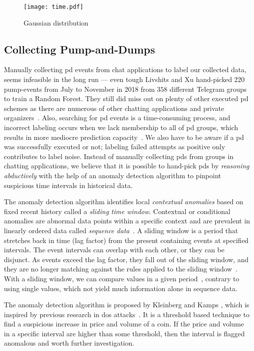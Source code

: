 \begin{figure}
    \centering
    \texttt{[image: time.pdf]}
    \caption{Gaussian distribution}
    \label{fig:unixtime}
\end{figure}

\subsection{Collecting Pump-and-Dumps}
Manually collecting \ac{pd} events from chat applications to label our collected data, seems infeasible in the long run — even tough Livshits and Xu \cite{P&D_anatomy} hand-picked $220$ pump-events from July to November in 2018 from $358$ different Telegram groups to train a Random Forest. They still did miss out on plenty of other executed \ac{pd} schemes as there are numerous of other chatting applications and private organizers~\cite{blockonomi}. Also, searching for \ac{pd} events is a time-consuming process, and incorrect labeling occurs when we lack membership to all of \ac{pd} groups, which results in more mediocre prediction capacity~\cite{label_noise}. We also have to be aware if a \ac{pd} was successfully executed or not; labeling failed attempts as positive only contributes to label noise. Instead of manually collecting \acp{pd} from groups in chatting applications, we believe that it is possible to hand-pick \acp{pd} by \emph{reasoning abductively} with the help of an anomaly detection algorithm to pinpoint suspicious time intervals in historical data.

The anomaly detection algorithm identifies local \emph{contextual anomalies} based on fixed recent history called a \emph{sliding time window}. Contextual or conditional anomalies are abnormal data points within a specific context and are prevalent in linearly ordered data called \emph{sequence data}~\cite{anomaly_survey}. A sliding window is a period that stretches back in time (lag factor) from the present containing events at specified intervals. The event intervals can overlap with each other, or they can be disjunct. As events exceed the lag factor, they fall out of the sliding window, and they are no longer matching against the rules applied to the sliding window~\cite{redhat}. With a sliding window, we can compare values in a given period~\cite{P&D_to_the_moon}, contrary to using single values, which not yield much information alone in sequence data.

The anomaly detection algorithm is proposed by Kleinberg and Kamps \cite{P&D_to_the_moon}, which is inspired by previous research in \ac{dos} attacks~\cite{dos}. It is a threshold based technique to find a suspicious increase in price and volume of a coin. If the price and volume in a specific interval are higher than some threshold, then the interval is flagged anomalous and worth further investigation.

